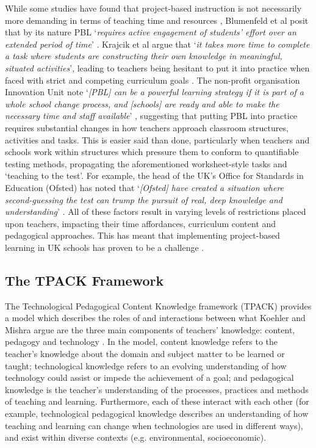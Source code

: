 \documentclass[,hyphens]{sigchi}
\begin{document}
While some studies have found that project-based instruction is not necessarily more demanding in terms of teaching time and resources \cite{Al-Balushi2014}, Blumenfeld et al posit that by its nature PBL `\textit{requires active engagement of students' effort over an extended period of time}' \cite{Blumenfeld1991}. Krajcik et al argue that `\textit{it takes more time to complete a task where students are constructing their own knowledge in meaningful, situated activities}', leading to teachers being hesitant to put it into practice when faced with strict and competing curriculum goals \cite{Krajcik2006}. The non-profit organisation Innovation Unit note `\textit{[PBL] can be a powerful learning strategy if it is part of a whole school change process, and [schools] are ready and able to make the necessary time and staff available}' \cite{InnovationUnit2016}, suggesting that putting PBL into practice requires substantial changes in how teachers approach classroom structures, activities and tasks. This is easier said than done, particularly when teachers and schools work within structures which pressure them to conform to quantifiable testing methods, propagating the aforementioned worksheet-style tasks and `teaching to the test'. For example, the head of the UK's Office for Standards in Education (Ofsted) has noted that `\textit{[Ofsted] have created a situation where second-guessing the test can trump the pursuit of real, deep knowledge and understanding}' \cite{Ofsted2018}. All of these factors result in varying levels of restrictions placed upon teachers, impacting their time affordances, curriculum content and pedagogical approaches. This has meant that  implementing project-based learning in UK schools has proven to be a challenge \cite{TheEducationEndowmentFoundation2016}.

\subsection{The TPACK Framework}

The Technological Pedagogical Content Knowledge framework (TPACK) provides a model which describes the roles of and interactions between what Koehler and Mishra argue are the three main components of teachers' knowledge: content, pedagogy and technology \cite{Harris2009}. In the model, content knowledge refers to the teacher's knowledge about the domain and subject matter to be learned or taught; technological knowledge refers to an evolving understanding of how technology could assist or impede the achievement of a goal; and pedagogical knowledge is the teacher's understanding of the processes, practices and methods of teaching and learning. Furthermore, each of these interact with each other (for example, technological pedagogical knowledge describes an understanding of how teaching and learning can change when technologies are used in different ways), and exist within diverse contexts (e.g. environmental, socioeconomic). 
\end{document}
